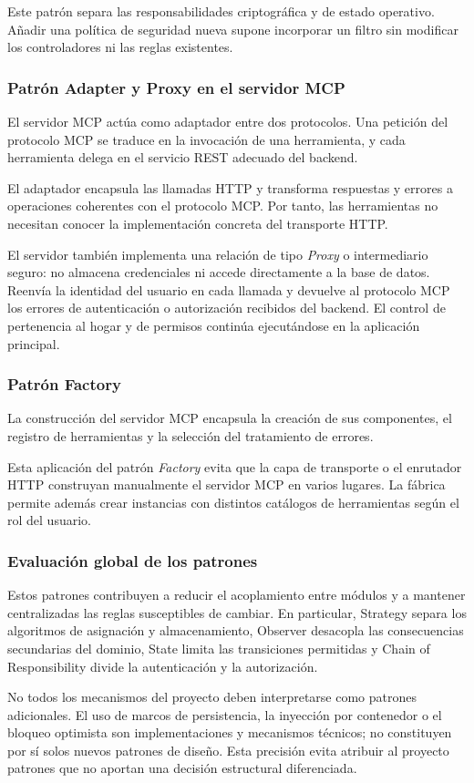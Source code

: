 Este patrón separa las responsabilidades criptográfica y de estado operativo. Añadir una política de seguridad nueva supone incorporar un filtro sin modificar los controladores ni las reglas existentes.

\subsubsection{Patrón Adapter y Proxy en el servidor MCP}

El servidor MCP actúa como adaptador entre dos protocolos. Una petición del protocolo MCP se traduce en la invocación de una herramienta, y cada herramienta delega en el servicio REST adecuado del backend.

El adaptador encapsula las llamadas HTTP y transforma respuestas y errores a operaciones coherentes con el protocolo MCP. Por tanto, las herramientas no necesitan conocer la implementación concreta del transporte HTTP.

El servidor también implementa una relación de tipo \emph{Proxy} o intermediario seguro: no almacena credenciales ni accede directamente a la base de datos. Reenvía la identidad del usuario en cada llamada y devuelve al protocolo MCP los errores de autenticación o autorización recibidos del backend. El control de pertenencia al hogar y de permisos continúa ejecutándose en la aplicación principal.

\subsubsection{Patrón Factory}

La construcción del servidor MCP encapsula la creación de sus componentes, el registro de herramientas y la selección del tratamiento de errores.

Esta aplicación del patrón \emph{Factory} evita que la capa de transporte o el enrutador HTTP construyan manualmente el servidor MCP en varios lugares. La fábrica permite además crear instancias con distintos catálogos de herramientas según el rol del usuario.

\subsubsection{Evaluación global de los patrones}

Estos patrones contribuyen a reducir el acoplamiento entre módulos y a mantener centralizadas las reglas susceptibles de cambiar. En particular, Strategy separa los algoritmos de asignación y almacenamiento, Observer desacopla las consecuencias secundarias del dominio, State limita las transiciones permitidas y Chain of Responsibility divide la autenticación y la autorización.

No todos los mecanismos del proyecto deben interpretarse como patrones adicionales. El uso de marcos de persistencia, la inyección por contenedor o el bloqueo optimista son implementaciones y mecanismos técnicos; no constituyen por sí solos nuevos patrones de diseño. Esta precisión evita atribuir al proyecto patrones que no aportan una decisión estructural diferenciada.
